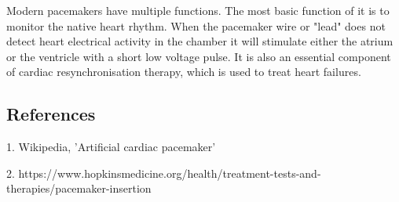 \documentclass[11pt]{article}
\begin{document}
Modern pacemakers have multiple functions. The most basic function of it is to monitor the native heart rhythm. When the pacemaker wire or "lead" does not detect heart electrical activity in the chamber it will stimulate either the atrium or the ventricle with a short low voltage pulse. It is also an essential component of cardiac resynchronisation therapy, which is used to treat heart failures. 


\subsection*{\centering References}

1. Wikipedia, 'Artificial cardiac pacemaker'

2. https://www.hopkinsmedicine.org/health/treatment-tests-and-therapies/pacemaker-insertion
\end{document}

